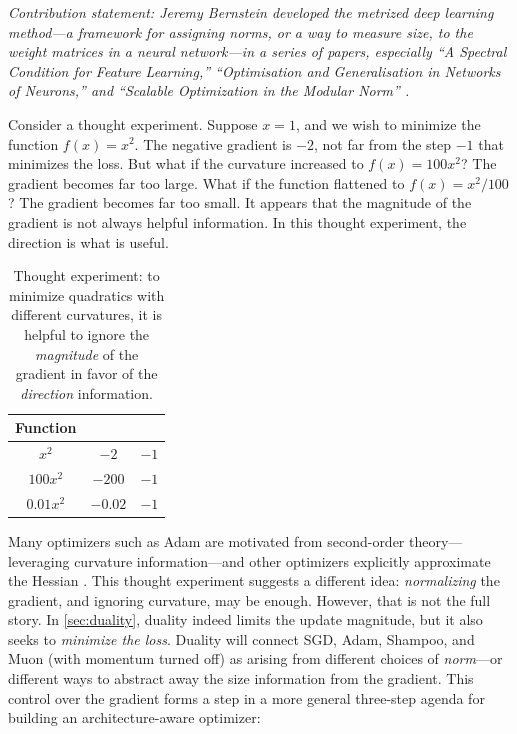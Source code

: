 \textit{Contribution statement: Jeremy Bernstein developed the metrized deep learning method---a framework for assigning norms, or a way to measure size, to the weight matrices in a neural network---in a series of papers, especially ``A Spectral Condition for Feature Learning,'' ``Optimisation and Generalisation in Networks of Neurons,'' and ``Scalable Optimization in the Modular Norm'' \citep{spectral-condition,bernstein2022optimisationgeneralisationnetworks,large2024}.}

\vspace{0.5em}

Consider a thought experiment. Suppose $x = 1$, and we wish to minimize the function $f(x) = x^2$. The negative gradient is $-2$, not far from the step $-1$ that minimizes the loss. But what if the curvature increased to $f(x) = 100x^2$? The gradient becomes far too large. What if the function flattened to $f(x) = x^2/100$? The gradient becomes far too small. It appears that the magnitude of the gradient is not always helpful information. In this thought experiment, the direction is what is useful.

\begin{table}[H]
  \centering
  \begin{tabular}{ccc}
    \textbf{Function} & \text{\textbf{Negative Gradient}} & \text{\textbf{Optimal Step}} \\
    \midrule[\heavyrulewidth]
    $x^2$ & $-2$ & $-1$ \\
    $100x^2$ & $-200$ & $-1$ \\
    $0.01x^2$ & $-0.02$ & $-1$
  \end{tabular}
  \caption{Thought experiment: to minimize quadratics with different curvatures, it is helpful to ignore the \textit{magnitude} of the gradient in favor of the \textit{direction} information.}
  \label{tab:gradient-thought-experiment}
\end{table}

Many optimizers such as Adam are motivated from second-order theory---leveraging curvature information---and other optimizers explicitly approximate the Hessian \citep{nocedal2006numerical,nesterov2006cubic}. This thought experiment suggests a different idea: \textit{normalizing} the gradient, and ignoring curvature, may be enough. However, that is not the full story. In \cref{sec:duality}, duality indeed limits the update magnitude, but it also seeks to \textit{minimize the loss}. Duality will connect SGD, Adam, Shampoo, and Muon (with momentum turned off) as arising from different choices of \textit{norm}---or different ways to abstract away the size information from the gradient. This control over the gradient forms a step in a more general three-step agenda for building an architecture-aware optimizer:

